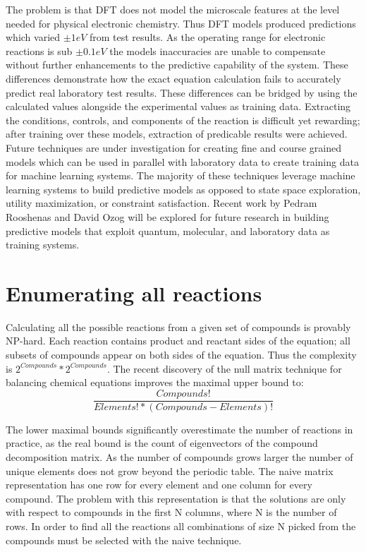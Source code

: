 \documentclass{article}
\begin{document}
The problem is that DFT does not model the microscale features at the level needed for physical electronic chemistry. Thus DFT models produced predictions which varied $\pm 1eV$ from test results. As the operating range for electronic reactions is sub $\pm 0.1eV$ the models inaccuracies are unable to compensate without further enhancements to the predictive capability of the system. These differences demonstrate how the exact equation calculation fails to accurately predict real laboratory test results. These differences can be bridged by using the calculated values alongside the experimental values as training data. Extracting the conditions, controls, and components of the reaction is difficult yet rewarding; after training over these models, extraction of predicable results were achieved. \cite{SILVER} \cite{ALO} \\

Future techniques are under investigation for creating fine and course grained models which can be used in parallel with laboratory data to create training data for machine learning systems. The majority of these techniques leverage machine learning systems to build predictive models as opposed to state space exploration, utility maximization, or constraint satisfaction. Recent work by Pedram Rooshenas and David Ozog will be explored for future research in building predictive models that exploit quantum, molecular, and laboratory data as training systems. \cite{PEDRAM} \cite{DAVID}

\newpage
\section{Enumerating all reactions}
Calculating all the possible reactions from a given set of compounds is provably NP-hard. Each reaction contains product and reactant sides of the equation; all subsets of compounds appear on both sides of the equation. Thus the complexity is $2^{Compounds} * 2^{Compounds}$. The recent discovery of the null matrix technique for balancing chemical equations improves the maximal upper bound to\cite{BALANCE}: $$\dfrac{{Compounds}!}{ Elements! * (Compounds - Elements)!}$$ 

The lower maximal bounds significantly overestimate the number of reactions in practice, as the real bound is the count of eigenvectors of the compound decomposition matrix. As the number of compounds grows larger the number of unique elements does not grow beyond the periodic table. The naive matrix representation has one row for every element and one column for every compound. The problem with this representation is that the solutions are only with respect to compounds in the first N columns, where N is the number of rows. In order to find all the reactions all combinations of size N picked from the compounds must be selected with the naive technique. \\
\end{document}

